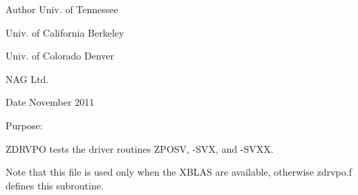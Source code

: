\begin{DoxyAuthor}{Author}
Univ. of Tennessee 

Univ. of California Berkeley 

Univ. of Colorado Denver 

N\+A\+G Ltd. 
\end{DoxyAuthor}
\begin{DoxyDate}{Date}
November 2011
\end{DoxyDate}
\begin{DoxyParagraph}{Purpose\+: }
\begin{DoxyVerb} ZDRVPO tests the driver routines ZPOSV, -SVX, and -SVXX.

 Note that this file is used only when the XBLAS are available,
 otherwise zdrvpo.f defines this subroutine.\end{DoxyVerb}
 
\end{DoxyParagraph}

